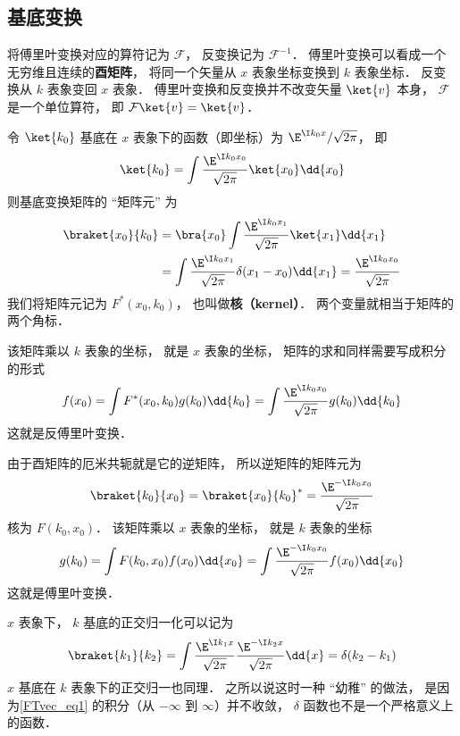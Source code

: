 \subsection{基底变换}

将傅里叶变换对应的算符记为 $\mathcal F$， 反变换记为 $\mathcal F^{-1}$． 傅里叶变换可以看成一个无穷维且连续的\textbf{酉矩阵}， 将同一个矢量从 $x$ 表象坐标变换到 $k$ 表象坐标． 反变换从 $k$ 表象变回 $x$ 表象． 傅里叶变换和反变换并不改变矢量 $\ket{v}$ 本身， $\mathcal F$ 是一个单位算符， 即 $\mathcal F \ket{v} = \ket{v}$．

令 $\ket{k_0}$ 基底在 $x$ 表象下的函数（即坐标）为 $\E^{\I k_0 x}/\sqrt{2\pi }$， 即
\begin{equation}
\ket{k_0} = \int \frac{\E^{\I k_0 x_0}}{\sqrt{2\pi }} \ket{x_0} \dd{x_0}
\end{equation}
则基底变换矩阵的 “矩阵元” 为
\begin{equation}
\begin{aligned}
\braket{x_0}{k_0} &= \bra{x_0}\int \frac{\E^{\I k_0 x_1}}{\sqrt{2\pi }} \ket{x_1} \dd{x_1}\\
&= \int \frac{\E^{\I k_0 x_1}}{\sqrt{2\pi }} \delta (x_1 - x_0) \dd{x_1}
= \frac{\E^{\I k_0 x_0}}{\sqrt{2\pi }}
\end{aligned}
\end{equation}
我们将矩阵元记为 $F^*(x_0, k_0)$， 也叫做\textbf{核（kernel）}． 两个变量就相当于矩阵的两个角标．

该矩阵乘以 $k$ 表象的坐标， 就是 $x$ 表象的坐标， 矩阵的求和同样需要写成积分的形式
\begin{equation}
f(x_0) = \int F^*(x_0, k_0) g(k_0) \dd{k_0} = \int \frac{\E^{\I k_0 x_0}}{\sqrt{2\pi }} g(k_0) \dd{k_0}
\end{equation}
这就是反傅里叶变换．

由于酉矩阵的厄米共轭就是它的逆矩阵， 所以逆矩阵的矩阵元为
\begin{equation}
\braket{k_0}{x_0} = \braket{x_0}{k_0}^* = \frac{\E^{-\I k_0 x_0}}{\sqrt{2\pi }}
\end{equation}
核为 $F(k_0, x_0)$． 该矩阵乘以 $x$ 表象的坐标， 就是 $k$ 表象的坐标
\begin{equation}
g(k_0) = \int F(k_0, x_0) f(x_0) \dd{x_0} = \int \frac{\E^{-\I k_0 x_0}}{\sqrt{2\pi }} f(x_0) \dd{x_0}
\end{equation}
这就是傅里叶变换．

$x$ 表象下， $k$ 基底的正交归一化可以记为
\begin{equation}\label{FTvec_eq1}
\braket{k_1}{k_2} = \int \frac{\E^{\I k_1 x}}{\sqrt{2\pi }} \frac{\E^{-\I k_2 x}}{\sqrt{2\pi }} \dd{x} = \delta (k_2 - k_1)
\end{equation}
$x$ 基底在 $k$ 表象下的正交归一也同理． 之所以说这时一种 “幼稚” 的做法， 是因为\autoref{FTvec_eq1} 的积分（从 $-\infty $ 到 $\infty$）并不收敛， $\delta $ 函数也不是一个严格意义上的函数．



